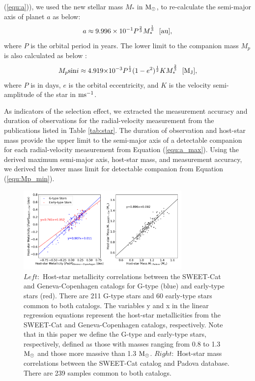 \documentclass[twocolumn]{aastex62}
\begin{document}
\begin{CJK*}{UTF8}{min}
(\ref{equ:a})), we used the new stellar mass $M_*$ in $\rm M_{\odot}$, to re-calculate the semi-major axis of planet $a$ as below:
\begin{equation}
\label{equ:a}
a \approx 9.996\times10^{-1}P^\frac{2}{3}M_{*}^\frac{1}{3}\ \ [{\rm au}] ,
\end{equation}
where $P$ is the orbital period in years. The lower limit to the companion mass $M_p$ is also calculated as below \citep{2008ApJ...677.1324T}:
\begin{equation}
\label{equ:Mp}
M_{p}{\sin}i \approx 4.919{\times}10^{-3}P^\frac{1}{3}(1-e^2)^\frac{1}{2}KM_{*}^\frac{2}{3}\ \ [{\rm M_J}] ,
\end{equation}
where $P$ is in days, $e$ is the orbital eccentricity, and $K$ is the velocity semi-amplitude of the star in $\rm ms^{-1}$.

As indicators of the selection effect, we extracted the measurement accuracy and duration of observations for the radial-velocity measurement from the publications listed in Table \ref{tab:star}. The duration of observation and host-star mass provide the upper limit to the semi-major axis of a detectable companion for each radial-velocity measurement from Equation (\ref{equ:a_max}). Using the derived maximum semi-major axis, host-star mass, and measurement accuracy, we derived the lower mass limit for detectable companion from Equation (\ref{equ:Mp_min}).

\begin{figure}[t]
\begin{center}
\includegraphics[width=8.5cm]{linear.pdf}
\caption{$Left:$ Host-star metallicity correlations between the SWEET-Cat and Geneva-Copenhagen catalogs for G-type (blue) and early-type stars (red). There are 211 G-type stars and 60 early-type stars common to both catalogs. The variables y and x in the linear regression equations represent the host-star metallicities from the SWEET-Cat and Geneva-Copenhagen catalogs, respectively. Note that in this paper we define the G-type and early-type stars, respectively, defined as those with masses ranging from 0.8 to 1.3 $\rm M_{\odot}$ and those more massive than 1.3 $\rm M_{\odot}$. $Right:$ Host-star mass correlations between the SWEET-Cat catalog and Padova database. There are 239 samples common to both catalogs.}
\label{fig:linear}
\end{center}
\end{figure}



\end{CJK*}
\end{document}
